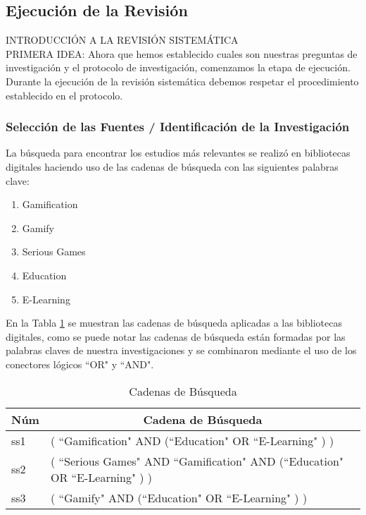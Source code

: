 \documentclass[fleqn,10pt]{SelfArx} %
\begin{document}


\subsection{Ejecución de la Revisión}
    INTRODUCCIÓN A LA REVISIÓN SISTEMÁTICA\\    
    PRIMERA IDEA: Ahora que hemos establecido cuales son nuestras preguntas de investigación y el protocolo de investigación, comenzamos la etapa de ejecución. Durante la ejecución de la revisión sistemática debemos respetar el procedimiento establecido en el protocolo.

    \subsubsection{Selección de las Fuentes / Identificación de la Investigación}
    La búsqueda para encontrar los estudios más relevantes se realizó en bibliotecas digitales haciendo uso de las cadenas de búsqueda con las siguientes palabras clave:
    \begin{enumerate}
        \item Gamification
        \item Gamify
        \item Serious Games
        \item Education
        \item E-Learning
    \end{enumerate}
    En la Tabla \ref{table:SearchString} se muestran las cadenas de búsqueda aplicadas a las bibliotecas digitales, como se puede notar las cadenas de búsqueda están formadas por las palabras claves de nuestra investigaciones y se combinaron mediante el uso de los conectores lógicos ``OR"{ }y ``AND". \\

\begin{table}
    \begin{center}
        \caption{Cadenas de Búsqueda}
        \label{table:SearchString}
        \begin{tabular}{| p{0.6cm} | p{7cm} |}
            \toprule
            \hline
            \multicolumn{1}{|c|}{\textbf{Núm}} & \multicolumn{1}{|c|}{\textbf{Cadena de Búsqueda}} \\
            \hline
            ss1 & ( ``Gamification"{ }AND (``Education"{ }OR ``E-Learning"{ }) )\\
            \hline
            ss2 & ( ``Serious Games"{ }AND ``Gamification"{ }AND (``Education"{ }OR ``E-Learning"{ }) )\\
            \hline            
            ss3 & ( ``Gamify"{ }AND (``Education"{ }OR ``E-Learning"{ }) )\\
            \hline
        \end{tabular}
    \end{center}
\end{table}
\end{document}
